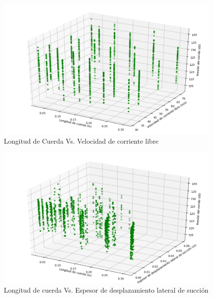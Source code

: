 \documentclass[12pt,spanish]{article} %
\begin{document}
\begin{figure}[H]
  \begin{center}
  \includegraphics[scale=.6]{Figure_8}
  \caption{Longitud de Cuerda Vs. Velocidad de corriente libre}
  \label{fig:Figure_8}
  \end{center}
\end{figure}

\begin{figure}[H]
  \begin{center}
  \includegraphics[scale=.6]{Figure_9}
  \caption{Longitud de cuerda Vs. Espesor de desplazamiento lateral de succión}
  \label{fig:Figure_9}
  \end{center}
\end{figure}
\end{document}
